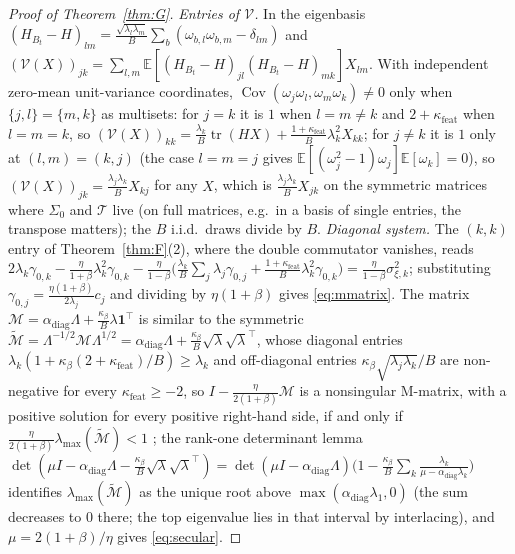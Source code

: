 \documentclass[11pt]{article}
\theoremstyle{remark}
\newcommand{\E}{\mathbb{E}}
\newcommand{\Cov}{\operatorname{Cov}}
\newcommand{\tr}{\operatorname{tr}}
\begin{document}
\begin{proof}[Proof of Theorem~\ref{thm:G}]
\emph{Entries of $\mathcal V$.} In the eigenbasis $(H_{B_t}-H)_{lm}=\frac{\sqrt{\lambda_l\lambda_m}}{B}\sum_b(\omega_{b,l}\omega_{b,m}-\delta_{lm})$ and $(\mathcal V(X))_{jk}=\sum_{l,m}\E[(H_{B_t}-H)_{jl}(H_{B_t}-H)_{mk}]X_{lm}$. With independent zero-mean unit-variance coordinates, $\Cov(\omega_j\omega_l,\omega_m\omega_k)\ne0$ only when $\{j,l\}=\{m,k\}$ as multisets: for $j=k$ it is $1$ when $l=m\ne k$ and $2+\kappa_{\mathrm{feat}}$ when $l=m=k$, so $(\mathcal V(X))_{kk}=\frac{\lambda_k}{B}\tr(HX)+\frac{1+\kappa_{\mathrm{feat}}}{B}\lambda_k^2X_{kk}$; for $j\ne k$ it is $1$ only at $(l,m)=(k,j)$ (the case $l=m=j$ gives $\E[(\omega_j^2-1)\omega_j]\E[\omega_k]=0$), so $(\mathcal V(X))_{jk}=\frac{\lambda_j\lambda_k}{B}X_{kj}$ for any $X$, which is $\frac{\lambda_j\lambda_k}{B}X_{jk}$ on the symmetric matrices where $\Sigma_0$ and $\mathcal T$ live (on full matrices, e.g.\ in a basis of single entries, the transpose matters); the $B$ i.i.d.\ draws divide by $B$. \emph{Diagonal system.} The $(k,k)$ entry of Theorem~\ref{thm:F}(2), where the double commutator vanishes, reads $2\lambda_k\gamma_{0,k}-\frac{\eta}{1+\beta}\lambda_k^2\gamma_{0,k}-\frac{\eta}{1-\beta}\big(\frac{\lambda_k}{B}\sum_j\lambda_j\gamma_{0,j}+\frac{1+\kappa_{\mathrm{feat}}}{B}\lambda_k^2\gamma_{0,k}\big)=\frac{\eta}{1-\beta}\sigma_{\xi,k}^2$; substituting $\gamma_{0,j}=\frac{\eta(1+\beta)}{2\lambda_j}c_j$ and dividing by $\eta(1+\beta)$ gives \eqref{eq:mmatrix}. The matrix $\mathcal M=\alpha_{\mathrm{diag}}\Lambda+\frac{\kappa_\beta}{B}\lambda\mathbf 1^\top$ is similar to the symmetric $\widetilde{\mathcal M}=\Lambda^{-1/2}\mathcal M\Lambda^{1/2}=\alpha_{\mathrm{diag}}\Lambda+\frac{\kappa_\beta}{B}\sqrt\lambda\sqrt\lambda^\top$, whose diagonal entries $\lambda_k(1+\kappa_\beta(2+\kappa_{\mathrm{feat}})/B)\ge\lambda_k$ and off-diagonal entries $\kappa_\beta\sqrt{\lambda_j\lambda_k}/B$ are non-negative for every $\kappa_{\mathrm{feat}}\ge-2$, so $I-\frac{\eta}{2(1+\beta)}\mathcal M$ is a nonsingular M-matrix, with a positive solution for every positive right-hand side, if and only if $\frac{\eta}{2(1+\beta)}\lambda_{\max}(\widetilde{\mathcal M})<1$ \citep[Ch.~6]{berman1994}; the rank-one determinant lemma $\det(\mu I-\alpha_{\mathrm{diag}}\Lambda-\frac{\kappa_\beta}{B}\sqrt\lambda\sqrt\lambda^\top)=\det(\mu I-\alpha_{\mathrm{diag}}\Lambda)\big(1-\frac{\kappa_\beta}{B}\sum_k\frac{\lambda_k}{\mu-\alpha_{\mathrm{diag}}\lambda_k}\big)$ identifies $\lambda_{\max}(\widetilde{\mathcal M})$ as the unique root above $\max(\alpha_{\mathrm{diag}}\lambda_1,0)$ (the sum decreases to $0$ there; the top eigenvalue lies in that interval by interlacing), and $\mu=2(1+\beta)/\eta$ gives \eqref{eq:secular}.

\end{proof}
\end{document}
